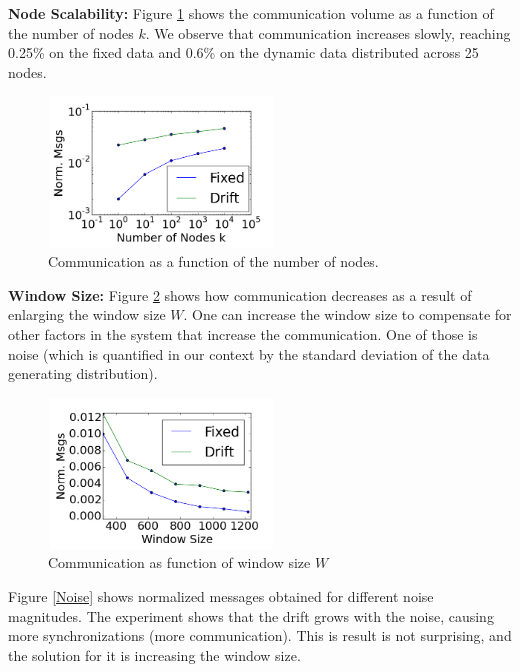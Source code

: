\documentclass{sig-alternate-05-2015}
\begin{document}
	
\noindent\textbf{Node Scalability:}
Figure \ref{Nodes} shows the communication volume as a function of the number of nodes $k$.
We observe that communication increases slowly, reaching 0.25\% on the fixed
data and 0.6\% on the dynamic data distributed across 25 nodes.
	\begin{figure}[h]
	\centering
	\includegraphics[width=60mm, height=4cm]{CommunicationOfFixedVsDrift/Nodes.png}
	\caption{Communication as a function of the number of nodes.}
	\label{Nodes}
	\end{figure}

\noindent\textbf{Window Size:}
Figure \ref{WindowSize} shows how communication decreases as a result
of enlarging the window size $W$.  One can increase the window size to compensate for other factors in the system that increase the communication. One of those is
noise (which is quantified in our context by the standard deviation of the
data generating distribution).
 \begin{figure}
	\centering
	\includegraphics[width=60mm, height=4cm]{CommunicationOfFixedVsDrift/WindowSize.png}
	\caption{Communication as function of window size $W$}
	\label{WindowSize}
	\end{figure}
Figure \ref{Noise} shows normalized messages obtained for different
noise magnitudes. The experiment shows that the drift grows with the noise, causing more synchronizations (more communication). This is result is not surprising, and the solution for it is increasing the window size.
\end{document}

